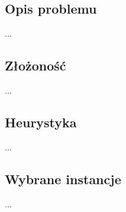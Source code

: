 \subsection{Opis problemu}

...

\subsection{Złożoność}

...

\subsection{Heurystyka}

...

\subsection{Wybrane instancje}

...